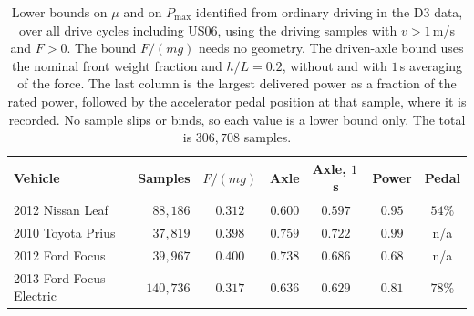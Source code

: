 \begin{table}[htbp]
\centering\small
\caption{Lower bounds on $\mu$ and on $P_{\max}$ identified from ordinary driving in the D3 data, over all drive cycles including US06, using the driving samples with $v>1$\,m/s and $F>0$. The bound $F/(mg)$ needs no geometry. The driven-axle bound uses the nominal front weight fraction and $h/L=0.2$, without and with $1$\,s averaging of the force. The last column is the largest delivered power as a fraction of the rated power, followed by the accelerator pedal position at that sample, where it is recorded. No sample slips or binds, so each value is a lower bound only. The total is $306{,}708$ samples.}\label{tab:app-d3}
\begin{tabular}{lrccccc}
\toprule
Vehicle & Samples & $F/(mg)$ & Axle & Axle, $1$\,s & Power & Pedal\\
\midrule
2012 Nissan Leaf & $88{,}186$ & $0.312$ & $0.600$ & $0.597$ & $0.95$ & $54\%$\\
2010 Toyota Prius & $37{,}819$ & $0.398$ & $0.759$ & $0.722$ & $0.99$ & n/a\\
2012 Ford Focus & $39{,}967$ & $0.400$ & $0.738$ & $0.686$ & $0.68$ & n/a\\
2013 Ford Focus Electric & $140{,}736$ & $0.317$ & $0.636$ & $0.629$ & $0.81$ & $78\%$\\
\bottomrule
\end{tabular}
\end{table}
